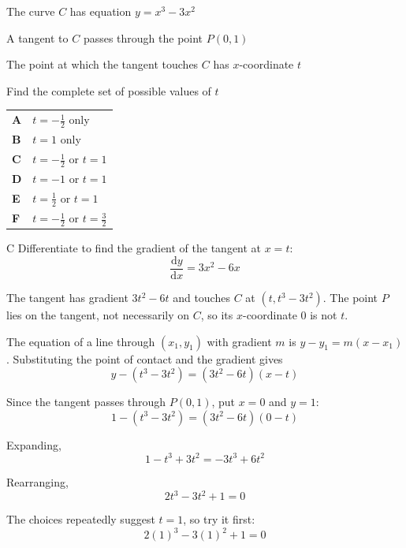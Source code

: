 \documentclass[11pt,a4paper]{article}
\begin{document}
\begin{enumerate}[label=\textbf{\arabic*.},leftmargin=*,itemsep=0pt,start=3]
\questionitem[Polynomials]
The curve $C$ has equation $y=x^3-3x^2$

A tangent to $C$ passes through the point $P(0,1)$

The point at which the tangent touches $C$ has $x$-coordinate $t$

Find the complete set of possible values of $t$

\par\vspace*{12pt}
\begin{tabularx}{\linewidth}{@{}>{\bfseries}l Y@{}}
A &
$t=-\frac12$ only
\\[0.8em]
B &
$t=1$ only
\\[0.8em]
C &
$t=-\frac12$ or $t=1$
\\[0.8em]
D &
$t=-1$ or $t=1$
\\[0.8em]
E &
$t=\frac12$ or $t=1$
\\[0.8em]
F &
$t=-\frac12$ or $t=\frac32$
\\
\end{tabularx}

\begin{djsSolution}{C}
Differentiate to find the gradient of the tangent at $x=t$:
\[
\frac{\mathrm{d}y}{\mathrm{d}x}=3x^2-6x
\]

The tangent has gradient $3t^2-6t$ and touches $C$ at $(t,t^3-3t^2)$. The point $P$ lies on the tangent, not necessarily on $C$, so its $x$-coordinate $0$ is not $t$.

The equation of a line through $(x_1,y_1)$ with gradient $m$ is $y-y_1=m(x-x_1)$. Substituting the point of contact and the gradient gives
\[
y-(t^3-3t^2)=(3t^2-6t)(x-t)
\]

Since the tangent passes through $P(0,1)$, put $x=0$ and $y=1$:
\[
1-(t^3-3t^2)=(3t^2-6t)(0-t)
\]

Expanding,
\[
1-t^3+3t^2=-3t^3+6t^2
\]

Rearranging,
\[
2t^3-3t^2+1=0
\]

The choices repeatedly suggest $t=1$, so try it first:
\[
2(1)^3-3(1)^2+1=0
\]


\end{djsSolution}
\end{enumerate}
\end{document}
